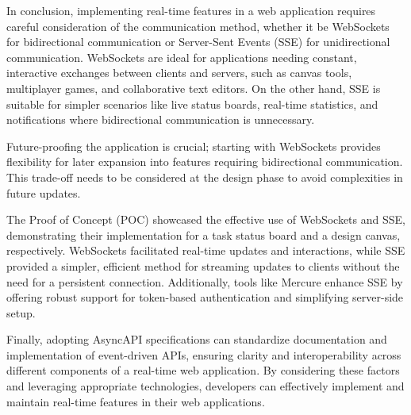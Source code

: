 In conclusion, implementing real-time features in a web application requires careful consideration of the communication method, whether it be WebSockets for bidirectional communication or Server-Sent Events (SSE) for unidirectional communication. WebSockets are ideal for applications needing constant, interactive exchanges between clients and servers, such as canvas tools, multiplayer games, and collaborative text editors. On the other hand, SSE is suitable for simpler scenarios like live status boards, real-time statistics, and notifications where bidirectional communication is unnecessary.

Future-proofing the application is crucial; starting with WebSockets provides flexibility for later expansion into features requiring bidirectional communication. This trade-off needs to be considered at the design phase to avoid complexities in future updates.

The Proof of Concept (POC) \cite{poc-client} \cite{poc-server} showcased the effective use of WebSockets and SSE, demonstrating their implementation for a task status board and a design canvas, respectively. WebSockets facilitated real-time updates and interactions, while SSE provided a simpler, efficient method for streaming updates to clients without the need for a persistent connection. Additionally, tools like Mercure enhance SSE by offering robust support for token-based authentication and simplifying server-side setup.

Finally, adopting AsyncAPI specifications can standardize documentation and implementation of event-driven APIs, ensuring clarity and interoperability across different components of a real-time web application. By considering these factors and leveraging appropriate technologies, developers can effectively implement and maintain real-time features in their web applications.

